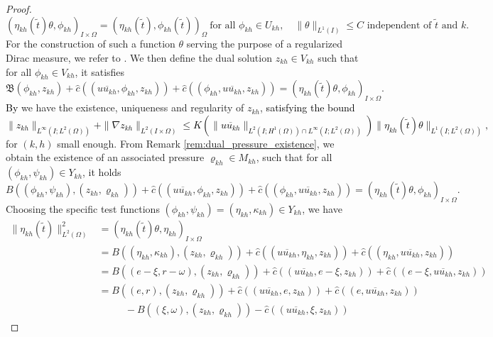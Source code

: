 \documentclass{m2an}
\newcommand\blue[1]{\textcolor{black}{#1}}
\newcommand{\IOprod}[1]{\left( #1 \right)_{I\times\Omega}}
\newcommand{\Oprod}[1]{\left( #1 \right)_{\Omega}}
\newcommand{\chatIO}[1]{\hat c \left(\!\left( #1 \right)\!\right)}
\newcommand{\uukh}{\overline{uu_{kh}}}
\newcommand{\Ukh}{U_{kh}}
\newcommand{\Vkh}{V_{kh}}
\newcommand{\Mkh}{M_{kh}}
\newcommand{\Xkh}{Y_{kh}}
\newcommand{\zkh}{z_{kh}}
\newcommand{\rhokh}{\varrho_{kh}}
\newcommand{\LtwoLtwo}{L^2(I \times \Omega)}
\newcommand{\OseenConstant}{K\left(\|\uukh\|_{L^2(I;H^1(\Omega))\cap L^\infty(I;L^2(\Omega))}\right)}
\begin{document}
\begin{proof}
\begin{equation*}
    \IOprod{\eta_{kh}(\tilde t)\theta,\phi_{kh}} = \Oprod{\eta_{kh}(\tilde t), \phi_{kh}(\tilde t)}
  \ \text{for all } \phi_{kh} \in \Ukh,
  \quad \|\theta \|_{L^1(I)} \le C \text{ independent of } \tilde t \text{ and } k.
  \end{equation*}
  For the construction of such a function $\theta$ serving the purpose of a regularized Dirac measure,
  we refer to \cite[Appendix A.5]{schatz_interior_1995}.
  We then define the dual solution $\zkh \in \Vkh$ such that
  for all $\phi_{kh} \in \Vkh$, it satisfies
  \begin{equation*}
    \mathfrak B(\phi_{kh},\zkh) 
    + \chatIO{\uukh,\phi_{kh},\zkh} 
    + \chatIO{\phi_{kh},\uukh,\zkh}
    = \IOprod{\eta_{kh}(\tilde t) \theta,\phi_{kh}}.
  \end{equation*}
  \blue{By }
  we have the existence, uniqueness and regularity of
  $\zkh$, \blue{ satisfying the bound
    \begin{equation}\label{eq:discrete_dual_bound}
    \|\zkh\|_{L^\infty(I;L^2(\Omega))} + \|\nabla \zkh\|_{\LtwoLtwo}
    \le \OseenConstant \|\eta_{kh}(\tilde t) \theta \|_{L^1(I;L^2(\Omega))},
\end{equation}}
for $(k,h)$ small enough.
  From Remark \ref{rem:dual_pressure_existence}, we obtain the existence of an 
  associated pressure $\rhokh \in \Mkh$, such that for all $(\phi_{kh},\psi_{kh}) \in \Xkh$, it holds
  \begin{equation*}
    B((\phi_{kh},\psi_{kh}),(\zkh,\rhokh)) 
    + \chatIO{\uukh,\phi_{kh},\zkh} 
    + \chatIO{\phi_{kh},\uukh,\zkh}
    = \IOprod{\eta_{kh}(\tilde t) \theta,\phi_{kh}}.
  \end{equation*}
  Choosing the specific test functions $(\phi_{kh},\psi_{kh}) = (\eta_{kh},\kappa_{kh}) \in \Xkh$, we have
  \begin{align*}
    \|\eta_{kh}(\tilde t)\|^2_{L^2(\Omega)} 
    & = \IOprod{\eta_{kh}(\tilde t)\theta,\eta_{kh}}\\
    & = B((\eta_{kh},\kappa_{kh}),(\zkh,\rhokh)) 
        + \chatIO{\uukh,\eta_{kh},\zkh} 
        + \chatIO{\eta_{kh},\uukh,\zkh}\\
    & = B((e-\xi,r - \omega),(\zkh,\rhokh)) 
        + \chatIO{\uukh,e-\xi,\zkh} 
        + \chatIO{e-\xi,\uukh,\zkh}\\
    & = B((e,r),(\zkh,\rhokh)) 
        + \chatIO{\uukh,e,\zkh} 
        + \chatIO{e,\uukh,\zkh}\\
    & \phantom{==} - B((\xi,\omega),(\zkh,\rhokh)) 
    - \chatIO{\uukh,\xi,\zkh} 

\end{align*}
\end{proof}
\end{document}
